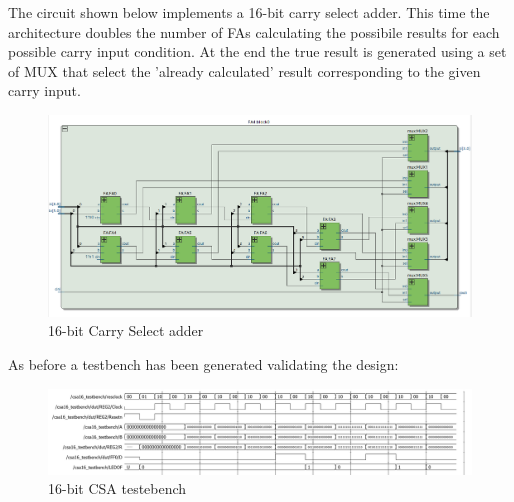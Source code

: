 \documentclass[12pt]{article}
\begin{document}
The circuit shown below implements a 16-bit carry select adder. This time the architecture doubles the number of FAs calculating the possibile results for each possible carry input condition. 
At the end the true result is generated using a set of MUX that select the 'already calculated' result corresponding to the given carry input. 
\begin{figure}[!h]
	\centering
	\includegraphics[scale = 0.4]{immagini/niki/rtl3.png}
	\caption{16-bit Carry Select adder }       
\end{figure}

As before a testbench has been generated validating the design:

\begin{figure}[!h]
	\centering
	\includegraphics[scale = 0.58]{immagini/niki/testbench3.png}
	\caption{16-bit CSA testebench}       
\end{figure}
\newpage
\end{document}
